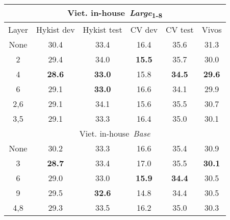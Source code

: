 \begin{table}[!ht]
\captionsetup{font=Large}
\centering
\begin{adjustbox}{width=0.45\columnwidth,center}
\begin{tabular}{|c|c|c|c|c|c|} 
\hline
\multicolumn{6}{|c|}{Viet. in-house~\textit{Large}\textsubscript{1-8}}                                                                              \\ 
\hline
Layer & Hykist dev             & Hykist test            & CV dev                 & CV test                & Vivos                   \\ 
\hline
None  & 30.4                   & 33.4                   & 16.4                   & 35.6                   & 31.3                    \\ 
\hline
2     & 29.4                   & 34.0                   & \textbf{15.5}          & 35.7                   & 30.0                    \\ 
\hline
4     & \textbf{\textbf{28.6}} & \textbf{\textbf{33.0}} & 15.8                   & \textbf{\textbf{34.5}} & \textbf{\textbf{29.6}}  \\ 
\hline
6     & 29.1                   & \textbf{33.0}          & 16.6                   & 34.1                   & 29.9                    \\ 
\hline
2,6   & 29.1                   & 34.1                   & 15.6                   & 35.5                   & 30.7                    \\ 
\hline
3,5   & 29.1                   & 33.3                   & 16.4                   & 35.0                   & 30.1                    \\ 
\hline
\multicolumn{6}{|c|}{Viet. in-house~\textit{Base}}                                                                                  \\ 
\hline
None  & 30.2                   & 33.3                   & 16.6                   & 35.4                   & 30.9                    \\ 
\hline
3     & \textbf{28.7}          & 33.4                   & 17.0                   & 35.5                   & \textbf{30.1}           \\ 
\hline
6     & 29.0                   & 33.0                   & \textbf{\textbf{15.9}} & \textbf{\textbf{34.4}} & 30.5                    \\ 
\hline
9     & 29.5                   & \textbf{32.6}          & 14.8                   & 34.4                   & 30.5                    \\ 
\hline
4,8   & 29.3                   & 33.5                   & 16.2                   & 35.0                   & 30.3                    \\
\hline
\end{tabular}
\end{adjustbox}
\caption{
    }
\label{WER_intLoss_multiple_layer}
\end{table}